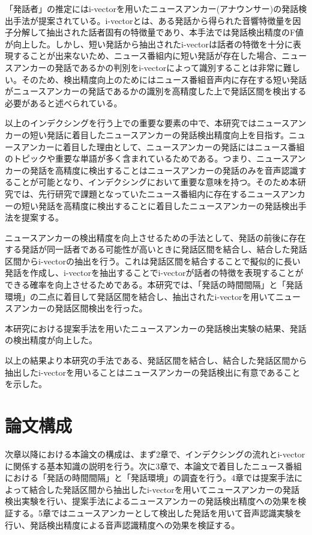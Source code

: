 「発話者」の推定にはi-vector\cite{iv}を用いたニュースアンカー(アナウンサー)の発話検出手法\cite{nozaki_gakuseikai}が提案されている。i-vectorとは、ある発話から得られた音響特徴量を因子分解して抽出された話者固有の特徴量であり、本手法では発話検出精度のF値が向上した。しかし、短い発話から抽出されたi-vectorは話者の特徴を十分に表現することが出来ないため\cite{panaiv}、ニュース番組内に短い発話が存在した場合、ニュースアンカーの発話であるかの判別をi-vectorによって識別することは非常に難しい。そのため、検出精度向上のためにはニュース番組音声内に存在する短い発話がニュースアンカーの発話であるかの識別を高精度した上で発話区間を検出する必要があると述べられている。\par

以上のインデクシングを行う上での重要な要素の中で、本研究ではニュースアンカーの短い発話に着目したニュースアンカーの発話検出精度向上を目指す。ニュースアンカーに着目した理由として、ニュースアンカーの発話にはニュース番組のトピックや重要な単語が多く含まれているためである。つまり、ニュースアンカーの発話を高精度に検出することはニュースアンカーの発話のみを音声認識することが可能となり、インデクシングにおいて重要な意味を持つ。そのため本研究では、先行研究\cite{nozaki_gakuseikai}で課題となっていたニュース番組内に存在するニュースアンカーの短い発話を高精度に検出することに着目したニュースアンカーの発話検出手法を提案する。\par

ニュースアンカーの検出精度を向上させるための手法として、発話の前後に存在する発話が同一話者である可能性が高いときに発話区間を結合し、結合した発話区間からi-vectorの抽出を行う。これは発話区間を結合することで擬似的に長い発話を作成し、i-vectorを抽出することでi-vectorが話者の特徴を表現することができる確率を向上させるためである。本研究では、「発話の時間間隔」と「発話環境」の二点に着目して発話区間を結合し、抽出されたi-vectorを用いてニュースアンカーの発話区間検出を行った。\par

本研究における提案手法を用いたニュースアンカーの発話検出実験の結果、発話の検出精度が向上した。\par

以上の結果より本研究の手法である、発話区間を結合し、結合した発話区間から抽出したi-vectorを用いることはニュースアンカーの発話検出に有意であることを示した。

\section{論文構成}
次章以降における本論文の構成は、まず2章で、インデクシングの流れとi-vectorに関係する基本知識の説明を行う。次に3章で、本論文で着目したニュース番組における「発話の時間間隔」と「発話環境」の調査を行う。4章では提案手法によって結合した発話区間から抽出したi-vectorを用いてニュースアンカーの発話検出実験を行い、提案手法によるニュースアンカーの発話検出精度への効果を検証する。5章ではニュースアンカーとして検出した発話を用いて音声認識実験を行い、発話検出精度による音声認識精度への効果を検証する。

